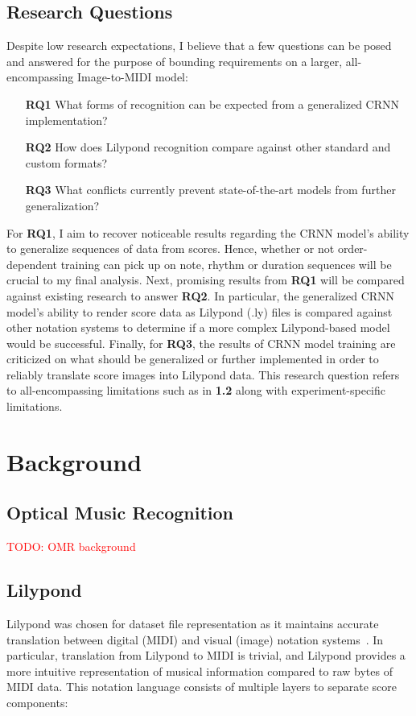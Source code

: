 \documentclass[review,sigconf]{acmart}
\newcommand{\todo}[1]{\textcolor{red}{TODO: #1}}
\begin{document}
\subsection{Research Questions}

Despite low research expectations, I believe that a few questions can be posed and answered for the purpose of bounding requirements on a larger, all-encompassing Image-to-MIDI model:

\begin{itemize}
	\item [\textbf{RQ1}] What forms of recognition can be expected from a generalized CRNN implementation?
	\item [\textbf{RQ2}] How does Lilypond recognition compare against other standard and custom formats?
	\item [\textbf{RQ3}] What conflicts currently prevent state-of-the-art models from further generalization?
\end{itemize}

For \textbf{RQ1}, I aim to recover noticeable results regarding the CRNN model's ability to generalize sequences of data from scores.
Hence, whether or not order-dependent training can pick up on note, rhythm or duration sequences will be crucial to my final analysis.
Next, promising results from \textbf{RQ1} will be compared against existing research to answer \textbf{RQ2}. 
In particular, the generalized CRNN model's ability to render score data as Lilypond (.ly) files is compared against other notation systems to determine if a more complex Lilypond-based model would be successful.
Finally, for \textbf{RQ3}, the results of CRNN model training are criticized on what should be generalized or further implemented in order to reliably translate score images into Lilypond data.
This research question refers to all-encompassing limitations such as in \textbf{1.2} along with experiment-specific limitations.

\section{Background}
\subsection{Optical Music Recognition}
\todo{OMR background}

\subsection{Lilypond}
Lilypond was chosen for dataset file representation as it maintains accurate translation between digital (MIDI) and visual (image) notation systems~\cite{lilypond}.
In particular, translation from Lilypond to MIDI is trivial, and Lilypond provides a more intuitive representation of musical information compared to raw bytes of MIDI data.
This notation language consists of multiple layers to separate score components:
\end{document}
